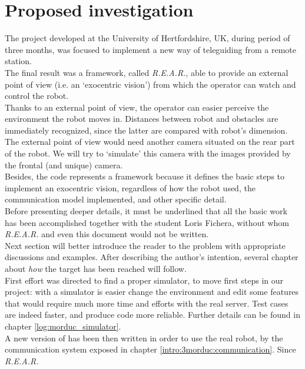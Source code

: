 \section{Proposed investigation}
\label{intro:proposed_investigation}

The project developed at the University of Hertfordshire,
UK, during period of three months, was focused to implement
a new way of teleguiding \morduc{} from a remote station.
\\
The final result was a framework, called \textit{R.E.A.R.},
able to provide an external point of view (i.e. an `exocentric
vision') from which the operator
can watch and control the robot.
\\
Thanks to an external point of view, the operator can easier
perceive the environment the robot moves in. Distances between
robot and obstacles are immediately recognized, since the latter
are compared with robot's dimension.
\\
The external point of view would need another camera situated
on the rear part of the robot. We will try to `simulate' this
camera with the images provided by the frontal (and unique)
camera.
\\
Besides, the code represents a framework because it defines the basic
steps to implement an exocentric vision, regardless of how the
robot used, the communication model implemented, and other
specific detail.
\\
Before presenting deeper details, it must be underlined that
all the basic work has been accomplished together with the
student Loris Fichera, without whom \textit{R.E.A.R.} and even
this document would not be written.
\\
Next section will better introduce the reader to the problem with
appropriate discussions and examples. After describing
the author's intention, several chapter about \textit{how} the
target has been reached will follow.
\\
First effort was directed to find a proper \morduc{} simulator,
to move first steps in our project: with a simulator is easier
change the environment and edit some features that would require
much more time and efforts with the real server. Test cases are
indeed faster, and produce code more reliable. Further details
can be found in chapter \ref{log:morduc_simulator}.
\\
A new version of \framework{} has been then written in order
to use the real \morduc{} robot, by the communication system exposed
in chapter \ref{intro:3morduc:communication}. Since \textit{R.E.A.R.}
